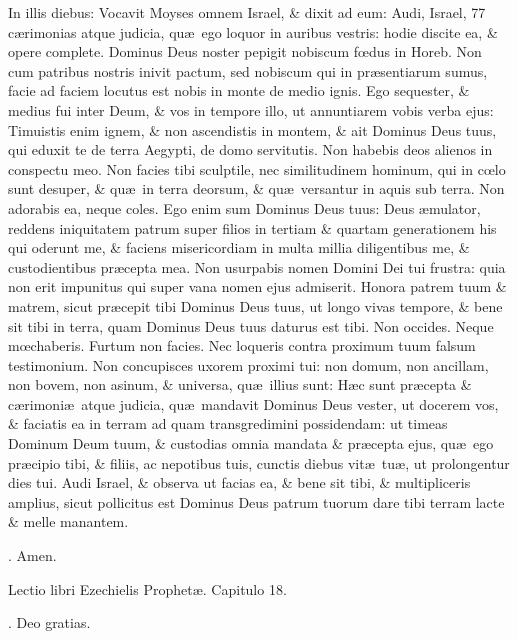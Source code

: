 \documentclass[letter,11pt]{book}
\makeatletter
\DeclareRobustCommand{\Rbar}{\vers@resp{0pt}{R}}
\newcommand{\vers@resp@sym}{\raisebox{0.2ex}{\rotatebox[origin=c]{-20}{$\m@th\rceil$}}}
\newcommand{\vers@resp}[2]{%
  {\ooalign{\hidewidth\kern#1\vers@resp@sym\hidewidth\cr#2\cr}}%
}%
\def\R{\color{Red} \Rbar . \color{black}}
\makeatother
\begin{document}
\begin{multicols*}{2}
In illis diebus: Vocavit Moyses omnem Israel, \& dixit ad eum: Audi, Israel, 77 c\ae rimonias atque judicia, qu\ae \ ego loquor in auribus vestris: hodie discite ea, \& opere complete. Dominus Deus noster pepigit nobiscum f\oe dus in Horeb. Non cum patribus nostris inivit pactum, sed nobiscum qui in pr\ae sentiarum sumus, facie ad faciem locutus est nobis in monte de medio ignis. Ego sequester, \& medius fui inter Deum, \& vos in tempore illo, ut annuntiarem vobis verba ejus: Timuistis enim ignem, \& non ascendistis in montem, \& ait Dominus Deus tuus, qui eduxit te de terra Aegypti, de domo servitutis. Non habebis deos alienos in conspectu meo. Non facies tibi sculptile, nec similitudinem hominum, qui in c\oe lo sunt desuper, \& qu\ae \ in terra deorsum, \& qu\ae \ versantur in aquis sub terra. Non adorabis ea, neque coles. Ego enim sum Dominus Deus tuus: Deus \ae mulator, reddens iniquitatem patrum super filios in tertiam \& quartam generationem his qui oderunt me, \& faciens misericordiam in multa millia diligentibus me, \& custodientibus pr\ae cepta mea. Non usurpabis nomen Domini Dei tui frustra: quia non erit impunitus qui super vana nomen ejus admiserit. Honora patrem tuum \& matrem, sicut pr\ae cepit tibi Dominus Deus tuus, ut longo vivas tempore, \& bene sit tibi in terra, quam Dominus Deus tuus daturus est tibi. Non occides. Neque m\oe chaberis. Furtum non facies. Nec loqueris contra proximum tuum falsum testimonium. Non concupisces uxorem proximi tui: non domum, non ancillam, non bovem, non asinum, \& universa, qu\ae \ illius sunt: H\ae c sunt pr\ae cepta \& c\ae rimoni\ae \ atque judicia, qu\ae \ mandavit Dominus Deus vester, ut docerem vos, \& faciatis ea in terram ad quam transgredimini possidendam: ut timeas Dominum Deum tuum, \& custodias omnia mandata \& pr\ae cepta ejus, qu\ae \ ego pr\ae cipio tibi, \& filiis, ac nepotibus tuis, cunctis diebus vit\ae \ tu\ae , ut prolongentur dies tui. Audi Israel, \& observa ut facias ea, \& bene sit tibi, \& multipliceris amplius, sicut pollicitus est Dominus Deus patrum tuorum dare tibi terram lacte \& melle manantem.

\R Amen.

Lectio libri Ezechielis Prophet\ae . Capitulo 18.

\R Deo gratias.


\end{multicols*}
\end{document}
